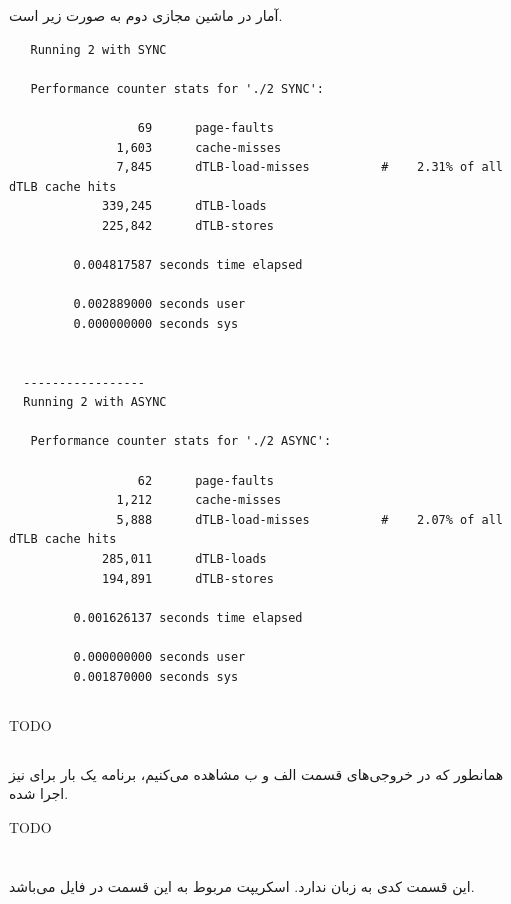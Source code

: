 \documentclass{article}
\begin{document}
آمار در ماشین مجازی دوم به صورت زیر است.
\begin{latin}
\begin{lstlisting}
   Running 2 with SYNC

   Performance counter stats for './2 SYNC':
  
                  69      page-faults                                                 
               1,603      cache-misses                                                
               7,845      dTLB-load-misses          #    2.31% of all dTLB cache hits 
             339,245      dTLB-loads                                                  
             225,842      dTLB-stores                                                 
  
         0.004817587 seconds time elapsed
  
         0.002889000 seconds user
         0.000000000 seconds sys
  
  
  -----------------
  Running 2 with ASYNC
  
   Performance counter stats for './2 ASYNC':
  
                  62      page-faults                                                 
               1,212      cache-misses                                                
               5,888      dTLB-load-misses          #    2.07% of all dTLB cache hits 
             285,011      dTLB-loads                                                  
             194,891      dTLB-stores                                                 
  
         0.001626137 seconds time elapsed
  
         0.000000000 seconds user
         0.001870000 seconds sys
\end{lstlisting}
\end{latin}

\subsection{}
TODO

\subsection{}
همانطور که در خروجی‌های قسمت الف و ب مشاهده می‌کنیم،‌ برنامه یک بار 
برای 
نیز اجرا شده. 

TODO

\section{}
این قسمت کدی به زبان 
ندارد. اسکریپت مربوط به این قسمت در فایل 
می‌باشد. 
\end{document}
